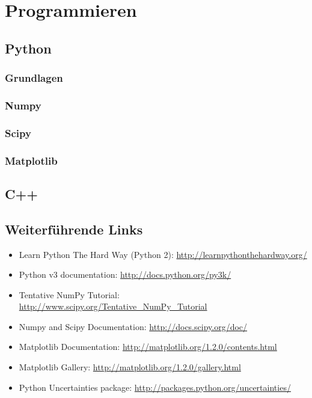 \chapter{Programmieren}
\section{Python}
\subsection{Grundlagen}
\subsection{Numpy}
\subsection{Scipy}
\subsection{Matplotlib}
\section{C++}
\section{Weiterführende Links}
\begin{itemize}
  \item Learn Python The Hard Way (Python 2): \href{http://learnpythonthehardway.org/}{http://learnpythonthehardway.org/}
  \item Python v3 documentation: \href{http://docs.python.org/py3k/}{http://docs.python.org/py3k/}
  \item Tentative NumPy Tutorial: \href{http://www.scipy.org/Tentative\_NumPy\_Tutorial}{http://www.scipy.org/Tentative\_NumPy\_Tutorial}
  \item Numpy and Scipy Documentation: \href{http://docs.scipy.org/doc/}{http://docs.scipy.org/doc/}
  \item Matplotlib Documentation: \href{http://matplotlib.org/1.2.0/contents.html}{http://matplotlib.org/1.2.0/contents.html}
  \item Matplotlib Gallery: \href{http://matplotlib.org/1.2.0/gallery.html}{http://matplotlib.org/1.2.0/gallery.html}
  \item Python Uncertainties package: \href{http://packages.python.org/uncertainties/}{http://packages.python.org/uncertainties/}
\end{itemize}
